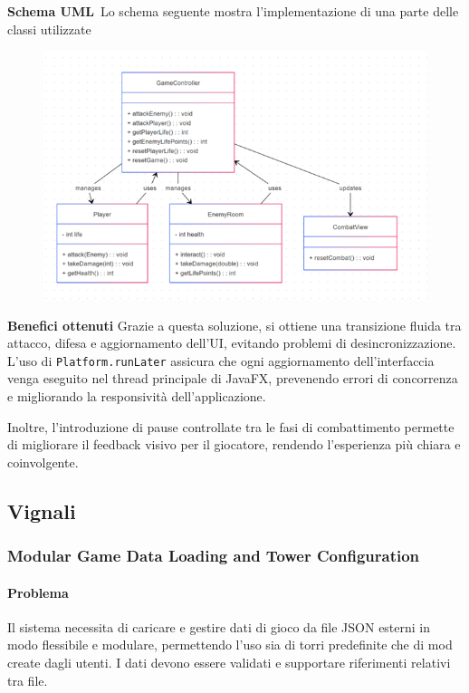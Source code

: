 \documentclass[a4paper,12pt]{report}
\begin{document}
\textbf{Schema UML}\
Lo schema seguente mostra l'implementazione di una parte delle classi utilizzate

\begin{figure}[H]
	\includegraphics[scale=0.9]{img/montanariPlatform.png}
\end{figure}

\textbf{Benefici ottenuti}
Grazie a questa soluzione, si ottiene una transizione fluida tra attacco, difesa e aggiornamento dell’UI, evitando problemi di desincronizzazione. L’uso di \texttt{Platform.runLater} assicura che ogni aggiornamento dell'interfaccia venga eseguito nel thread principale di JavaFX, prevenendo errori di concorrenza e migliorando la responsività dell'applicazione. 

Inoltre, l'introduzione di pause controllate tra le fasi di combattimento permette di migliorare il feedback visivo per il giocatore, rendendo l’esperienza più chiara e coinvolgente.


\subsection{Vignali}

\subsubsection{Modular Game Data Loading and Tower Configuration}

\paragraph{Problema} Il sistema necessita di caricare e gestire dati di gioco da file JSON esterni in modo flessibile e modulare, permettendo l'uso sia di torri predefinite che di mod create dagli utenti. I dati devono essere validati e supportare riferimenti relativi tra file.
\end{document}

